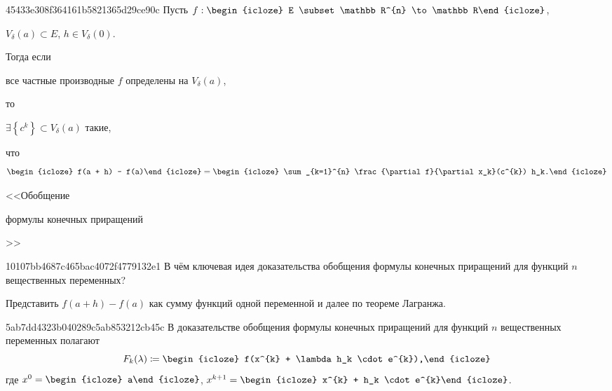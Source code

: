 \begin{note}{45433e308f364161b5821365d29ce90c}
    Пусть \({ f : \begin{icloze}{6}E \subset \mathbb R^{n} \to \mathbb R\end{icloze} }\),\: \begin{icloze}{5}\({ V_{\delta}(a) \subset E }\),\: \({ h \in V_{\delta}(0) }\).\end{icloze}
    Тогда если \begin{icloze}{4}все частные производные \({ f }\) определены на \({ V_{\delta}(a) }\),\end{icloze} то
    \begin{icloze}{3}\({ \exists \left\{ c^{k} \right\} \subset V_{\delta}(a) }\) такие,\end{icloze} что
    \[
        \begin{icloze}{2}f(a + h) - f(a)\end{icloze} = \begin{icloze}{1}\sum_{k=1}^{n} \frac{\partial f}{\partial x_k}(c^{k}) h_k.\end{icloze}
    \]

    \begin{center}
        \tiny
        <<Обобщение \begin{icloze}{2}формулы конечных приращений\end{icloze}>>
    \end{center}
\end{note}

\begin{note}{10107bb4687c465bac4072f4779132e1}
    В чём ключевая идея доказательства обобщения формулы конечных приращений для функций \({ n }\) вещественных переменных?

    \begin{cloze}{1}
        Представить \({ f(a + h) - f(a) }\) как сумму функций одной переменной и далее по теореме Лагранжа.
    \end{cloze}
\end{note}

\begin{note}{5ab7dd4323b040289c5ab853212cb45c}
    В доказательстве обобщения формулы конечных приращений для функций \({ n }\) вещественных переменных полагают
    \[
        F_k (\lambda) \coloneqq \begin{icloze}{2}f(x^{k} + \lambda h_k \cdot e^{k}),\end{icloze}
    \]
    где \({ x^{0} = \begin{icloze}{2}a\end{icloze} }\),\: \({ x^{k+1} = \begin{icloze}{2}x^{k} + h_k \cdot e^{k}\end{icloze} }\).
\end{note}

